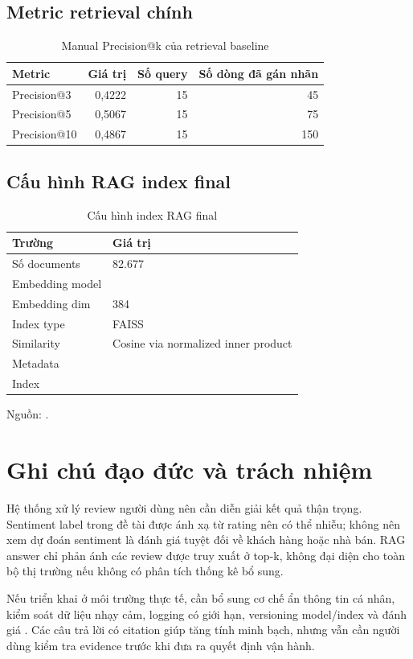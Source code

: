 \section{Metric retrieval chính}
\begin{table}[H]
\centering
\caption{Manual Precision@k của retrieval baseline}
\label{tab:appendix-retrieval-metrics}
\begin{tabular}{lrrr}
\toprule
Metric & Giá trị & Số query & Số dòng đã gán nhãn \\
\midrule
Precision@3 & 0,4222 & 15 & 45 \\
Precision@5 & 0,5067 & 15 & 75 \\
Precision@10 & 0,4867 & 15 & 150 \\
\bottomrule
\end{tabular}
\end{table}

\section{Cấu hình RAG index final}
\begin{table}[H]
\centering
\caption[Cấu hình index RAG final]{Cấu hình index RAG final}
\label{tab:appendix-rag-config}
\begin{tabularx}{\textwidth}{L{0.32\textwidth}Y}
\toprule
Trường & Giá trị \\
\midrule
Số documents & 82.677 \\
Embedding model &  \\
Embedding dim & 384 \\
Index type & FAISS  \\
Similarity & Cosine via normalized inner product \\
Metadata &  \\
Index &  \\
\bottomrule
\end{tabularx}
{\footnotesize Nguồn: .}
\end{table}

\chapter{Ghi chú đạo đức và trách nhiệm}

Hệ thống xử lý review người dùng nên cần diễn giải kết quả thận trọng. Sentiment label trong đề tài được ánh xạ từ rating nên có thể nhiễu; không nên xem dự đoán sentiment là đánh giá tuyệt đối về khách hàng hoặc nhà bán. RAG answer chỉ phản ánh các review được truy xuất ở top-k, không đại diện cho toàn bộ thị trường nếu không có phân tích thống kê bổ sung.

Nếu triển khai ở môi trường thực tế, cần bổ sung cơ chế ẩn thông tin cá nhân, kiểm soát dữ liệu nhạy cảm, logging có giới hạn, versioning model/index và đánh giá \HumanInLoop{}. Các câu trả lời có citation giúp tăng tính minh bạch, nhưng vẫn cần người dùng kiểm tra evidence trước khi đưa ra quyết định vận hành.


